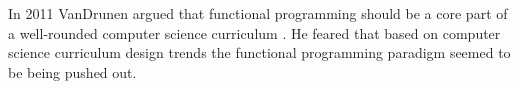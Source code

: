 In 2011 VanDrunen argued that functional programming should be a core
part of a well-rounded computer science curriculum
\cite{VanDrunen:2011}.  He feared that based on computer science
curriculum design trends the functional programming paradigm seemed to
be being pushed out.
